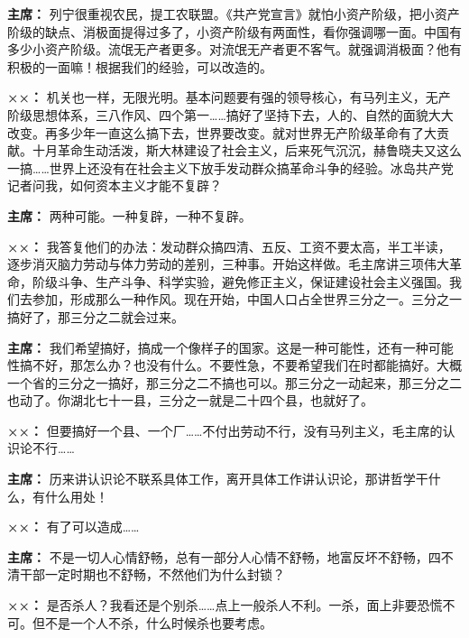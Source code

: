 \begin{list}{}
\item[\textbf{主席：}] 列宁很重视农民，提工农联盟。《共产党宣言》就怕小资产阶级，把小资产阶级的缺点、消极面提得过多了，小资产阶级有两面性，看你强调哪一面。中国有多少小资产阶级。流氓无产者更多。对流氓无产者更不客气。就强调消极面？他有积极的一面嘛！根据我们的经验，可以改造的。

\item[\textbf{××：}] 机关也一样，无限光明。基本问题要有强的领导核心，有马列主义，无产阶级思想体系，三八作风、四个第一……搞好了坚持下去，人的、自然的面貌大大改变。再多少年一直这么搞下去，世界要改变。就对世界无产阶级革命有了大贡献。十月革命生动活泼，斯大林建设了社会主义，后来死气沉沉，赫鲁晓夫又这么一搞……世界上还没有在社会主义下放手发动群众搞革命斗争的经验。冰岛共产党记者问我，如何资本主义才能不复辟？

\item[\textbf{主席：}] 两种可能。一种复辟，一种不复辟。

\item[\textbf{××：}] 我答复他们的办法：发动群众搞四清、五反、工资不要太高，半工半读，逐步消灭脑力劳动与体力劳动的差别，三种事。开始这样做。毛主席讲三项伟大革命，阶级斗争、生产斗争、科学实验，避免修正主义，保证建设社会主义强国。我们去参加，形成那么一种作风。现在开始，中国人口占全世界三分之一。三分之一搞好了，那三分之二就会过来。

\item[\textbf{主席：}] 我们希望搞好，搞成一个像样子的国家。这是一种可能性，还有一种可能性搞不好，那怎么办？也没有什么。不要性急，不要希望我们在时都能搞好。大概一个省的三分之一搞好，那三分之二不搞也可以。那三分之一动起来，那三分之二也动了。你湖北七十一县，三分之一就是二十四个县，也就好了。

\item[\textbf{××：}] 但要搞好一个县、一个厂……不付出劳动不行，没有马列主义，毛主席的认识论不行……

\item[\textbf{主席：}] 历来讲认识论不联系具体工作，离开具体工作讲认识论，那讲哲学干什么，有什么用处！

\item[\textbf{××：}] 有了可以造成……

\item[\textbf{主席：}] 不是一切人心情舒畅，总有一部分人心情不舒畅，地富反坏不舒畅，四不清干部一定时期也不舒畅，不然他们为什么封锁？

\item[\textbf{××：}] 是否杀人？我看还是个别杀……点上一般杀人不利。一杀，面上非要恐慌不可。但不是一个人不杀，什么时候杀也要考虑。


\end{list}
